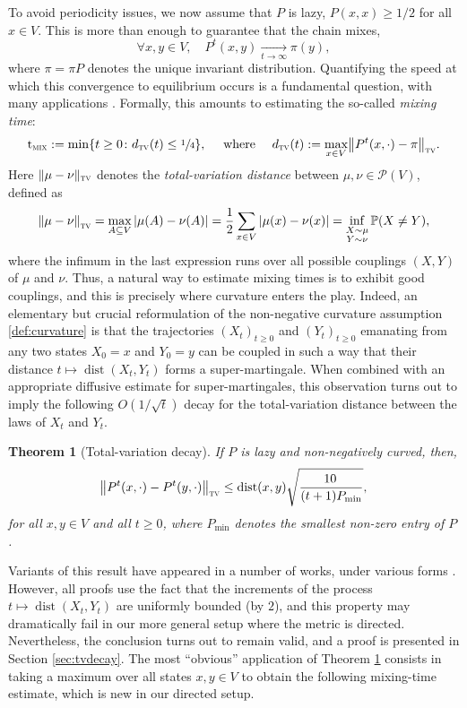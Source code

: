 \documentclass[JEP,XML,SOM,Unicode,NoEqCountersInSection,published]{cedram}
\newtheorem{theorem}{Theorem}
\theoremstyle{definition}
\newcommand{\PP}{{\mathbb{P}}}
\newcommand{\cP}{\mathcal{P}}
\newcommand{\dtv}{d_{\textup{\textsc{tv}}}}
\newcommand{\tv}{\textup{\textsc{tv}}}
\newcommand{\tmix}{\mathrm{t}_{\textup{\textsc{mix}}}}
\newcommand{\pmin}{P_{\mathrm{min}}}
\DeclareMathOperator{\dist}{dist}
\begin{document}
To avoid periodicity issues, we now assume that $P$ is lazy, \ie $P(x,x)\ge 1/2$ for all $x\in V$. This is more than enough to guarantee that the chain mixes, \ie
\begin{equation*}
\forall x,y\in V,\quad P^t(x,y) \xrightarrow[t\to\infty]{} \pi(y),
\end{equation*}
where $\pi=\pi P$ denotes the unique invariant distribution. Quantifying the speed at which this convergence to equilibrium occurs is a fundamental question, with many applications \cite{MR3726904,MR2341319}. Formally, this amounts to estimating the so-called \emph{mixing time}:
\begin{equation*}
\tmix := \min\{t\ge 0\colon \dtv(t)\le \sfrac{1}{4}\}, \quad\textrm{ where }\quad \dtv(t) := \max_{x\in V}\bigl\|P^t(x,\cdot)-\pi\bigr\|_{\tv}.
\end{equation*}
Here $\|\mu-\nu\|_{\tv}$ denotes the \emph{total-variation distance} between $\mu,\nu\in\cP(V)$, defined as
\begin{equation*}
\left\|\mu-\nu\right\|_{\tv} = \max_{A\subseteq V}|\mu(A)-\nu(A)| =\frac{1}{2}\sum_{x\in V}|\mu(x)-\nu(x)| =\inf_{\substack{X\sim \mu\\Y\sim\nu}}\PP(X\ne Y),
\end{equation*}
where the infimum in the last expression runs over all possible couplings $(X,Y)$ of $\mu$ and $\nu$. Thus, a natural way to estimate mixing times is to exhibit good couplings, and this is precisely where curvature enters the play. Indeed, an elementary but crucial reformulation of the non-negative curvature assumption \eqref{def:curvature} is that the trajectories $(X_t)_{t\ge 0}$ and $(Y_t)_{t\ge 0}$ emanating from any two states $X_0=x$ and $Y_0=y$ can be coupled in such a way that their distance $t\mapsto \dist(X_t,Y_t)$ forms a super-martingale. When combined with an appropriate diffusive estimate for super-martingales, this observation turns out to imply the following $O(1/\sqrt{t})$ decay for the total-variation distance between the laws of $X_t$ and $Y_t$.
\begin{theorem}[Total-variation decay]\label{th:tvdecay}If $P$ is lazy and non-negatively curved, then,
\begin{equation*}
\left\|P^t(x,\cdot)-P^t(y,\cdot)\right\|_{\tv} \le \dist(x,y)\sqrt{\frac{10\,}{{(t+1)\pmin }}},
\end{equation*}
for all $x,y\in V$ and all $t\ge 0$, where $\pmin$ denotes the smallest non-zero entry of $P$.
\end{theorem}
Variants of this result have appeared in a number of works, under various forms \cite{MR2316551,lin2015equivalent,munch2019non,salez2021sparse}. However, all proofs use the fact that the increments of the process $t\mapsto \dist(X_t,Y_t)$ are uniformly bounded (by $2$), and this property may dramatically fail in our more general setup where the metric is directed. Nevertheless, the conclusion turns out to remain valid, and a proof is presented in Section \ref{sec:tvdecay}. The most ``obvious'' application of Theorem \ref{th:tvdecay} consists in taking a maximum over all states $x,y\in V$ to obtain the following mixing-time estimate, which is new in our directed setup.
\end{document}
